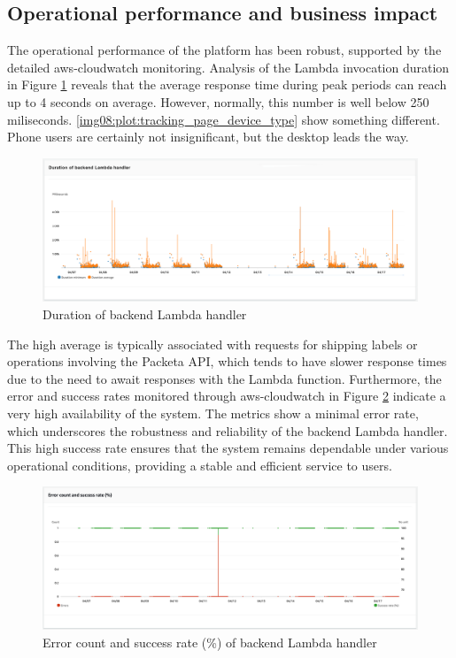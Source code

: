 \subsection{Operational performance and business impact}
\label{subsec:operational-performance-business-impact}
The operational performance of the platform has been robust, supported by the detailed \gls{aws-cloudwatch} monitoring.
Analysis of the Lambda invocation duration in Figure \ref{img08:plot:lambda_handler_durations} reveals that the average response time during peak periods can reach up to 4 seconds on average.
However, normally, this number is well below 250 miliseconds.
\ref{img08:plot:tracking_page_device_type} show something different.
Phone users are certainly not insignificant, but the desktop leads the way.
\begin{figure}[H]\centering
\includegraphics[width=140mm]{img/chap08/lambda_handler_durations.png}
\caption{Duration of backend Lambda handler}
\label{img08:plot:lambda_handler_durations}
\end{figure}
The high average is typically associated with requests for shipping labels or operations involving the Packeta API, which tends to have slower response times due to the need to await responses with the Lambda function.
Furthermore, the error and success rates monitored through \gls{aws-cloudwatch} in Figure \ref{img08:plot:lambda_handler_errors} indicate a very high availability of the system. The metrics show a minimal error rate, which underscores the robustness and reliability of the backend Lambda handler. This high success rate ensures that the system remains dependable under various operational conditions, providing a stable and efficient service to users.
\begin{figure}[H]\centering
\includegraphics[width=140mm]{img/chap08/lambda_handler_errors.png}
\caption{Error count and success rate (\%) of backend Lambda handler}
\label{img08:plot:lambda_handler_errors}
\end{figure}

